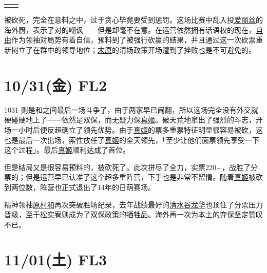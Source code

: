 \begin{tabular}{lr}
{\begin{minipage}{.45\textwidth}
\end{minipage}}
\end{tabular}
\CTEXindent
\clearpage
{}被砍死，完全在意料之中，过于贪心毕竟要受到惩罚。这场比赛中乱入投\uline{爱丽丝}的海外厨，表示了对的嘲讽——但是却毫不在意。在运营依然拥有话语权的现在，\uline{自由}作为领袖对局势有着自信，预料到了被强行砍赢的结果，并且通过这一次砍票重新树立了在群中的领导地位；\uline{末原}的清场政策开场遭到了挫败也是不可避免的。

\section{10/31(金) FL2}


1031 则是和之间最后一场斗争了，由于两家早已闹翻，所以这场完全没有外交就硬碰硬地上了——依然是双保，而无疑力保\uline{真姬}。破天荒地拿出了强烈的斗志，开场一小时后便反超确立了领先优势。由于\uline{真姬}的票多重票特征明显很容易被砍，这也是最后一次出场，索性放任了\uline{真姬}的全天领先，「至少让他们面票领先享受一下这个过程」。最后\uline{真姬}顺利达成了首位。

但是结局又是很容易预料的，被砍死了。此次拼尽了全力，实票220+，战胜了分票的；但是运营早已认准了这个超多重阵营，下手也是非常不留情。随着\uline{真姬}被砍到两位数，阵营也正式退出了14年的日萌赛场。

精神领袖\uline{原村和}再次突破胜场纪录，去年战绩最好的\uline{清水谷龙华}也顶住了分票压力晋级，至于\uline{松实宥}则成为了双保政策的牺牲品。海外再一次为本土的弃保坚定赞叹不已。

\section{11/01(土) FL3}

